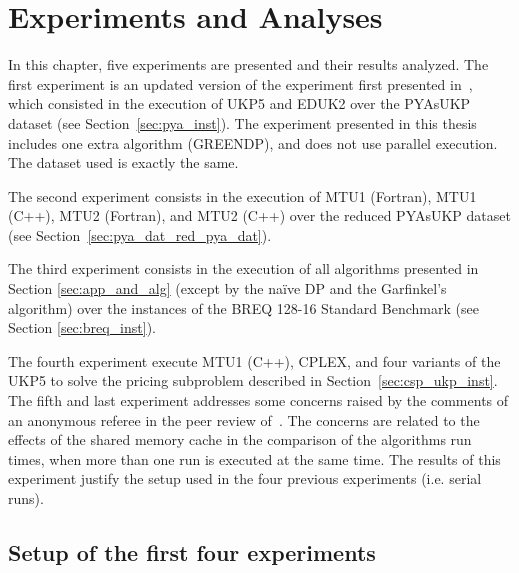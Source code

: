 
\chapter{Experiments and Analyses}
\label{sec:exp_and_res}

In this chapter, five experiments are presented and their results analyzed.
The first experiment is an updated version of the experiment first presented in~\cite{sea2016}, which consisted in the execution of UKP5 and EDUK2 over the PYAsUKP dataset (see Section~\ref{sec:pya_inst}).
The experiment presented in this thesis includes one extra algorithm (GREENDP), and does not use parallel execution.
The dataset used is exactly the same.

The second experiment consists in the execution of MTU1 (Fortran), MTU1 (C++), MTU2 (Fortran), and MTU2 (C++) over the reduced PYAsUKP dataset (see Section~\ref{sec:pya_dat_red_pya_dat}).

The third experiment consists in the execution of all algorithms presented in Section \ref{sec:app_and_alg} (except by the naïve DP and the Garfinkel's algorithm) over the instances of the BREQ 128-16 Standard Benchmark (see Section \ref{sec:breq_inst}).


The fourth experiment execute MTU1 (C++), CPLEX, and four variants of the UKP5 to solve the pricing subproblem described in Section~\ref{sec:csp_ukp_inst}.
The fifth and last experiment addresses some concerns raised by the comments of an anonymous referee in the peer review of~\cite{sea2016}. 
The concerns are related to the effects of the shared memory cache in the comparison of the algorithms run times, when more than one run is executed at the same time.
The results of this experiment justify the setup used in the four previous experiments (i.e. serial runs).

\section{Setup of the first four experiments}

